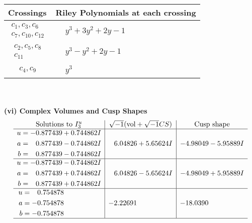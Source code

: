 \documentclass[1p]{elsarticle_modified}
\theoremstyle{definition}
\newcommand{\I}{\sqrt{-1}}
\begin{document}
\begin{tabular}{m{50pt}|m{274pt}}
Crossings & \hspace{64pt}Riley Polynomials at each crossing \\
\hline $$\begin{aligned}c_{1},c_{3},c_{6}\\c_{7},c_{10},c_{12}\end{aligned}$$&$\begin{aligned}
&y^3+3 y^2+2 y-1
\end{aligned}$\\
\hline $$\begin{aligned}c_{2},c_{5},c_{8}\\c_{11}\end{aligned}$$&$\begin{aligned}
&y^3- y^2+2 y-1
\end{aligned}$\\
\hline $$\begin{aligned}c_{4},c_{9}\end{aligned}$$&$\begin{aligned}
&y^3
\end{aligned}$\\
\hline
\end{tabular}\\~\\
\newpage\flushleft \textbf{(vi) Complex Volumes and Cusp Shapes}
$$\begin{array}{c|c|c}  
\text{Solutions to }I^u_{3}& \I (\text{vol} + \sqrt{-1}CS) & \text{Cusp shape}\\
 \hline 
\begin{aligned}
u &= -0.877439 + 0.744862 I \\
a &= \phantom{-}0.877439 - 0.744862 I \\
b &= \phantom{-}0.877439 - 0.744862 I\end{aligned}
 & \phantom{-}6.04826 + 5.65624 I & -4.98049 - 5.95889 I \\ \hline\begin{aligned}
u &= -0.877439 - 0.744862 I \\
a &= \phantom{-}0.877439 + 0.744862 I \\
b &= \phantom{-}0.877439 + 0.744862 I\end{aligned}
 & \phantom{-}6.04826 - 5.65624 I & -4.98049 + 5.95889 I \\ \hline\begin{aligned}
u &= \phantom{-}0.754878\phantom{ +0.000000I} \\
a &= -0.754878\phantom{ +0.000000I} \\
b &= -0.754878\phantom{ +0.000000I}\end{aligned}
 & -2.22691\phantom{ +0.000000I} & -18.0390\phantom{ +0.000000I}\\
 \hline 
 \end{array}$$\newpage\newpage\renewcommand{\arraystretch}{1}
\end{document}
